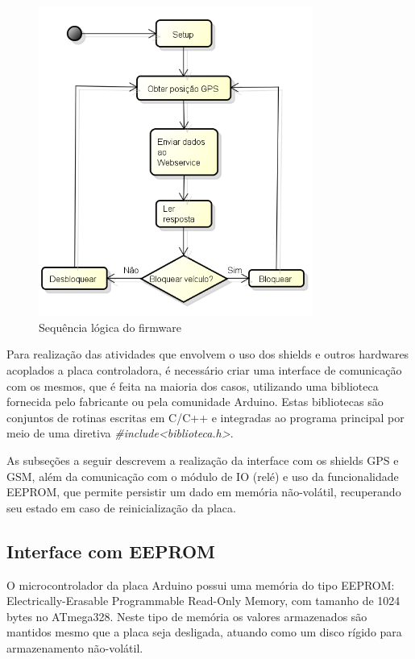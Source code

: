 \begin{figure}[!htb]
\centering
\includegraphics[width=0.8\textwidth]{figures/atividades_hl.png}
\caption{Sequência lógica do firmware}
\label{fig:sequencialogicabasica}
\end{figure}

Para realização das atividades que envolvem o uso dos shields e outros hardwares acoplados a placa controladora, é necessário criar uma interface de comunicação com os mesmos, que é feita na maioria dos casos, utilizando uma biblioteca fornecida pelo fabricante ou pela comunidade Arduino. Estas bibliotecas são conjuntos de rotinas escritas em C/C++ e integradas ao programa principal por meio de uma diretiva \emph{\#include<biblioteca.h>}.

As subseções a seguir descrevem a realização da interface com os shields GPS e GSM, além da comunicação com o módulo de IO (relé) e uso da funcionalidade EEPROM, que permite persistir um dado em memória não-volátil, recuperando seu estado em caso de reinicialização da placa.

\newpage
\subsection{Interface com EEPROM}

O microcontrolador da placa Arduino possui uma memória do tipo EEPROM: Electrically-Erasable Programmable Read-Only Memory, com tamanho de 1024 bytes no ATmega328. Neste tipo de memória os valores armazenados são mantidos mesmo que a placa seja desligada, atuando como um disco rígido para armazenamento não-volátil.

